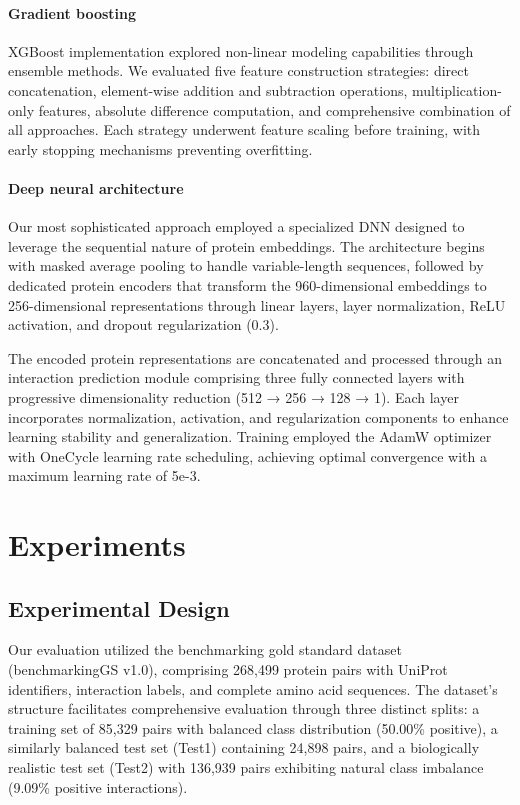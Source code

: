 \documentclass{article}
\begin{document}
	\paragraph{Gradient boosting} XGBoost implementation explored non-linear modeling capabilities through ensemble methods. We evaluated five feature construction strategies: direct concatenation, element-wise addition and subtraction operations, multiplication-only features, absolute difference computation, and comprehensive combination of all approaches. Each strategy underwent feature scaling before training, with early stopping mechanisms preventing overfitting.

	\paragraph{Deep neural architecture} Our most sophisticated approach employed a specialized DNN designed to leverage the sequential nature of protein embeddings. The architecture begins with masked average pooling to handle variable-length sequences, followed by dedicated protein encoders that transform the 960-dimensional embeddings to 256-dimensional representations through linear layers, layer normalization, ReLU activation, and dropout regularization (0.3). 
	
	The encoded protein representations are concatenated and processed through an interaction prediction module comprising three fully connected layers with progressive dimensionality reduction (512 → 256 → 128 → 1). Each layer incorporates normalization, activation, and regularization components to enhance learning stability and generalization. Training employed the AdamW optimizer with OneCycle learning rate scheduling, achieving optimal convergence with a maximum learning rate of 5e-3.
	
	\section{Experiments}
    
	\subsection{Experimental Design}

	Our evaluation utilized the benchmarking gold standard dataset (benchmarkingGS v1.0), comprising 268,499 protein pairs with UniProt identifiers, interaction labels, and complete amino acid sequences. The dataset's structure facilitates comprehensive evaluation through three distinct splits: a training set of 85,329 pairs with balanced class distribution (50.00\% positive), a similarly balanced test set (Test1) containing 24,898 pairs, and a biologically realistic test set (Test2) with 136,939 pairs exhibiting natural class imbalance (9.09\% positive interactions).
\end{document}
